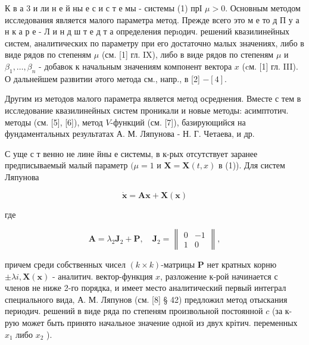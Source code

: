 \documentclass[10pt]{article}
\begin{document}
К в а 3 и ли н е й ны е с и с т е мы - системы (1) прІ $\mu>0$. Основным методом исследования является малого параметра метод. Прежде всего это м е то д П у а н к а р е - Л и н д ш т е д т а определения перıодич. решений квазилинейных систем, аналитических по параметру при его достаточно малых значениях, либо в виде рядов по степеням $\mu$ (см. [1] гл. IX), либо в виде рядов по степеням $\mu$ и $\beta_{1}, \ldots, \beta_{n}$ - добавок к начальным значениям компонент вектора $x$ (cм. [1] гл. III). О дальнейшем развитии әтого метода см., напр., в [2] $-[4]$.



Другим из методов малого параметра является метод осреднения. Вместе с тем в исследование квазилинейных систем проникали и новые методы: асимптотич. методы (см. [5], [6]), метод $V$-функций (см. [7]), базирующийся на фундаментальных результатах А. М. Ляпунова - Н. Г. Четаева, и др.



С уще с т венно не лине йны е системы, в к-рых отсутствует заранее предписываемый малый параметр $(\mu=1$ и $\boldsymbol{X}=\boldsymbol{X}(t, x)$ в (1)). Для систем Ляпунова



\[

\dot{\boldsymbol{x}}=\boldsymbol{A} \boldsymbol{x}+\boldsymbol{X}(\boldsymbol{x})

\]



где



\[

\boldsymbol{A}=\lambda_{2} \boldsymbol{J}_{2}+\boldsymbol{P}, \quad \boldsymbol{J}_{2}=\left\|\begin{array}{rr}

0 & -1 \\

1 & 0

\end{array}\right\|,

\]



причем среди собственных чисел $(k \times k)$-матрицы $\boldsymbol{P}$ нет кратных корню $\pm \lambda i, \boldsymbol{X}(\boldsymbol{x})$ - аналитич. вектор-функция $x$, разложение к-рой начинается с членов не ниже 2-го порядка, и имеет место аналитический первый интеграл специального вида, А. М. Ляпунов (см. [8] § 42) предложил метод отыскания периодич. решений в виде ряда по степеням произвольной постоянной $c$ (за к-рую может быть принято начальное значение одной из двух крітич. переменных $x_{1}$ либо $x_{2}$ ).
\end{document}
